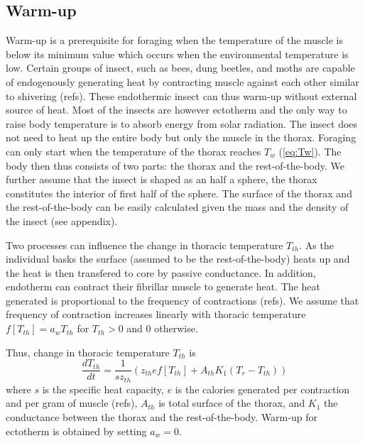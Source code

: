 \subsection*{Warm-up}
Warm-up is a prerequisite for foraging when the temperature of the muscle is below its minimum value which occurs when the environmental temperature is low. 
Certain groups of insect, such as bees, dung beetles, and moths are capable of endogenously generating heat by contracting muscle against each other similar to shivering (refs).
These endothermic insect can thus warm-up without external source of heat. 
Most of the insects are however ectotherm and the only way to raise body temperature is to absorb energy from solar radiation.
The insect does not need to heat up the entire body but only the muscle in the thorax.
Foraging can only start when the temperature of the thorax reaches $T_w$ (\cref{eq:Tw}).
The body then thus consists of two parts: the thorax and the rest-of-the-body.
We further assume that the insect is shaped as an half a sphere, the thorax constitutes the interior of first half of the sphere.
The surface of the thorax and the rest-of-the-body can be easily calculated given the mass and the density of the insect (see appendix).

Two processes can influence the change in thoracic temperature $T_{th}$.
As the individual basks the surface (assumed to be the rest-of-the-body) heats up and the heat is then transfered to core by passive conductance.
In addition, endotherm can contract their fibrillar muscle to generate heat.
The heat generated is proportional to the frequency of contractions (refs).
We assume that frequency of contraction increases linearly with thoracic temperature $f[T_{th}]  = a_w T_{th}$ for $T_{th}> 0$ and 0 otherwise.

Thus, change in thoracic temperature $T_{th}$ is 
\begin{equation} \label{eq:dTh}
	\frac{dT_{th}}{dt} = \frac{1}{s z_{th}} (z_{th} e f[T_{th}] +  A_{th} K_1(T_r - T_{th}))
\end{equation}
where $s$ is the specific heat capacity, $e$ is the calories generated per contraction and per gram of muscle (refs), $A_{th}$ is total surface of the thorax, and $K_1$ the conductance between the thorax and the rest-of-the-body.
Warm-up for ectotherm is obtained by setting $a_w = 0$.

